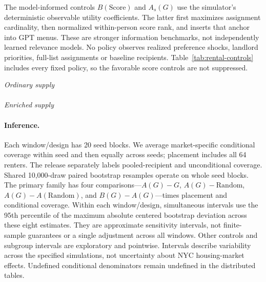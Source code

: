 The model-informed controls $B(\mathrm{Score})$ and $A_s(G)$ use the
simulator's deterministic observable utility coefficients. The latter first
maximizes assignment cardinality, then normalized within-person score rank,
and inserts that anchor into GPT menus. These are stronger information
benchmarks, not independently learned relevance models. No policy observes
realized preference shocks, landlord priorities, full-list assignments or
baseline recipients. Table~\ref{tab:rental-controls} includes every fixed
policy, so the favorable score controls are not suppressed.

\begin{table}[ht]\centering\small
\caption{All nine fixed rental policies. Rates in percent; coverage is the
equal-market conditional mean. These are levels, not paired significance
tests. The archived contrasts contain the paired intervals.}\label{tab:rental-controls}
\textit{Ordinary supply}\\[3pt]
\\[9pt]
\textit{Enriched supply}\\[3pt]

\end{table}

\paragraph{Inference.}
Each window/design has 20 seed blocks. We average market-specific conditional
coverage within seed and then equally across seeds; placement includes all
64 renters. The release separately labels pooled-recipient and unconditional
coverage. Shared 10,000-draw paired bootstrap resamples operate on whole seed
blocks. The primary family has four comparisons---$A(G)-G$,
$A(G)-\mathrm{Random}$, $A(G)-A(\mathrm{Random})$, and $B(G)-A(G)$---times
placement and conditional coverage. Within each window/design, simultaneous
intervals use the 95th percentile of the maximum absolute centered bootstrap
deviation across these eight estimates. They are approximate sensitivity
intervals, not finite-sample guarantees or a single adjustment across all
windows. Other controls and subgroup intervals are exploratory and pointwise.
Intervals describe variability across the specified simulations, not
uncertainty about NYC housing-market effects. Undefined conditional
denominators remain undefined in the distributed tables.

\begin{table}[ht]\centering\small
\caption{Balancing cached GPT ranks versus the original GPT anchor,
$B(G)-A(G)$. Percentage points with simultaneous intervals from the same
eight-comparison families as Table~\ref{tab:rental-access}. Exits count
recipients under $A(G)$ who become unmatched under $B(G)$.}\label{tab:rental-balancing}

\end{table}

